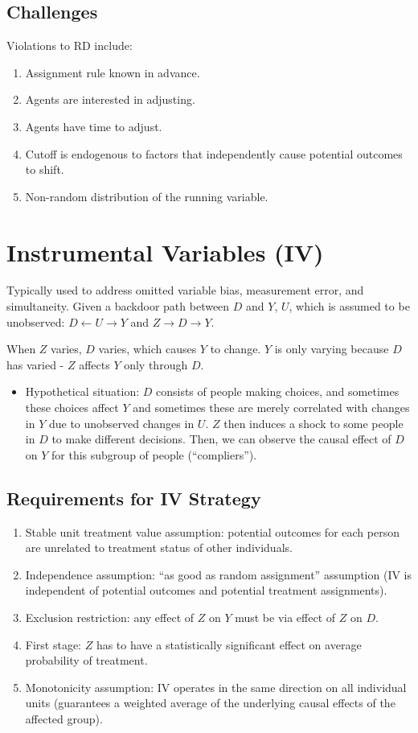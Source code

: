 \documentclass{article}
\begin{document}
\subsection*{Challenges}
Violations to RD include:
\begin{enumerate}
    \item Assignment rule known in advance.
    \item Agents are interested in adjusting.
    \item Agents have time to adjust.
    \item Cutoff is endogenous to factors that independently cause potential outcomes to shift.
    \item Non-random distribution of the running variable.
\end{enumerate}

\section*{Instrumental Variables (IV)}
Typically used to address omitted variable bias, measurement error, and simultaneity. Given a backdoor path between \(D\) and \(Y\), \(U\), which is assumed to be unobserved: \(D \leftarrow U \rightarrow Y\) and \(Z \rightarrow D \rightarrow Y\).

When \(Z\) varies, \(D\) varies, which causes \(Y\) to change. \(Y\) is only varying because \(D\) has varied - \(Z\) affects \(Y\) only through \(D\).

\begin{itemize}
    \item Hypothetical situation: \(D\) consists of people making choices, and sometimes these choices affect \(Y\) and sometimes these are merely correlated with changes in \(Y\) due to unobserved changes in \(U\). \(Z\) then induces a shock to some people in \(D\) to make different decisions. Then, we can observe the causal effect of \(D\) on \(Y\) for this subgroup of people (``compliers'').
\end{itemize}

\subsection*{Requirements for IV Strategy}
\begin{enumerate}
    \item Stable unit treatment value assumption: potential outcomes for each person are unrelated to treatment status of other individuals.
    \item Independence assumption: ``as good as random assignment'' assumption (IV is independent of potential outcomes and potential treatment assignments).
    \item Exclusion restriction: any effect of \(Z\) on \(Y\) must be via effect of \(Z\) on \(D\).
    \item First stage: \(Z\) has to have a statistically significant effect on average probability of treatment.
    \item Monotonicity assumption: IV operates in the same direction on all individual units (guarantees a weighted average of the underlying causal effects of the affected group).
\end{enumerate}
\end{document}
